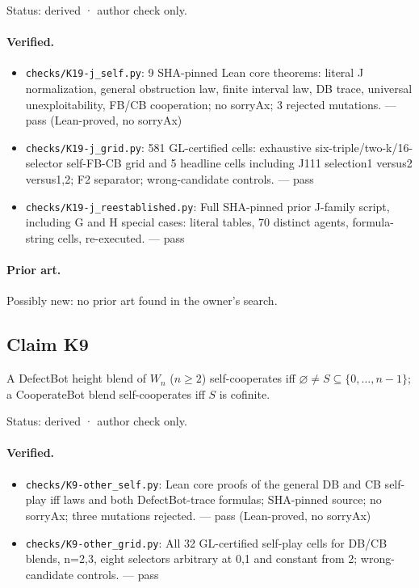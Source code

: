 \documentclass{article}
\begin{document}
Status: derived · author check only.

\paragraph{Verified.}
\begin{itemize}
\item \texttt{checks/K19-j\_self.py}: 9 SHA-pinned Lean core theorems: literal J normalization, general obstruction law, finite interval law, DB trace, universal unexploitability, FB/CB cooperation; no sorryAx; 3 rejected mutations. --- pass (Lean-proved, no sorryAx)
\item \texttt{checks/K19-j\_grid.py}: 581 GL-certified cells: exhaustive six-triple/two-k/16-selector self-FB-CB grid and 5 headline cells including J111 selection1 versus2 versus1,2; F2 separator; wrong-candidate controls. --- pass
\item \texttt{checks/K19-j\_reestablished.py}: Full SHA-pinned prior J-family script, including G and H special cases: literal tables, 70 distinct agents, formula-string cells, re-executed. --- pass
\end{itemize}

\paragraph{Prior art.} Possibly new: no prior art found in the owner's search.

\subsection*{Claim K9}

A DefectBot height blend of $W_n$ ($n\ge2$) self-cooperates iff $\varnothing\ne S\subseteq\{0,\ldots,n-1\}$; a CooperateBot blend self-cooperates iff $S$ is cofinite.

Status: derived · author check only.

\paragraph{Verified.}
\begin{itemize}
\item \texttt{checks/K9-other\_self.py}: Lean core proofs of the general DB and CB self-play iff laws and both DefectBot-trace formulas; SHA-pinned source; no sorryAx; three mutations rejected. --- pass (Lean-proved, no sorryAx)
\item \texttt{checks/K9-other\_grid.py}: All 32 GL-certified self-play cells for DB/CB blends, n=2,3, eight selectors arbitrary at 0,1 and constant from 2; wrong-candidate controls. --- pass
\end{itemize}
\end{document}
